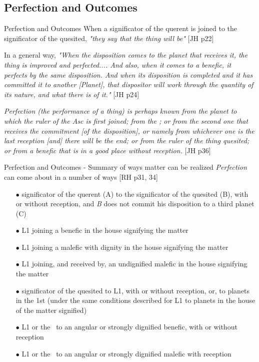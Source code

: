 \subsection{Perfection and Outcomes}
\begin{frame}[t]{Perfection and Outcomes}
When a significator of the querent is joined to the significator of the quesited, \textsl{"they say that the thing will be"} [JH p22]

In a general way, \textsl{"When the disposition comes to the planet that receives it, the thing is improved and perfected.... And also, when it comes to a benefic, it perfects by the same disposition. And when its disposition is completed and it has committed it to another [Planet], that dispositor will work through the quantity of its nature, and what there is of it."} [JH p24]

\begin{block}{}
\textsl{Perfection (the performance of a thing) is perhaps known from the planet to which the ruler of the Asc is first joined; from the \Moon; or from the second one that receives the commitment [of the disposition], or namely from whichever one is the last reception [and] there will be the end; or from the ruler of the thing quesited; or from a benefic that is in a good place without reception.} [JH p36]
\end{block}

\end{frame}
\begin{frame}[t]{Perfection and Outcomes - Summary of ways matter can be realized}
\textsl{Perfection} can come about in a number of ways [RH p31, 34]
\small
\begin{itemize}
\item[$\bullet$] significator of the querent (A) to the significator of the quesited (B), with or without reception, and \textsl{B} does not commit his disposition to a third planet (C)
\item[$\bullet$] L1 joining a benefic in the house signifying the matter
\item[$\bullet$] L1 joining a malefic with dignity in the house signifying the matter
\item[$\bullet$] L1 joining, and received by, an undignified malefic in the house signifying the matter
\item[$\bullet$] significator of the quesited to L1, with or without reception, or, to planets in the 1st (under the same conditions described for L1 to planets in the house of the matter signified)
\item[$\bullet$] L1 or the \Moon\ to an angular or strongly dignified benefic, with or without reception
\item[$\bullet$] L1 or the \Moon\ to an angular or strongly dignified malefic with reception
\end{itemize}

\end{frame}
